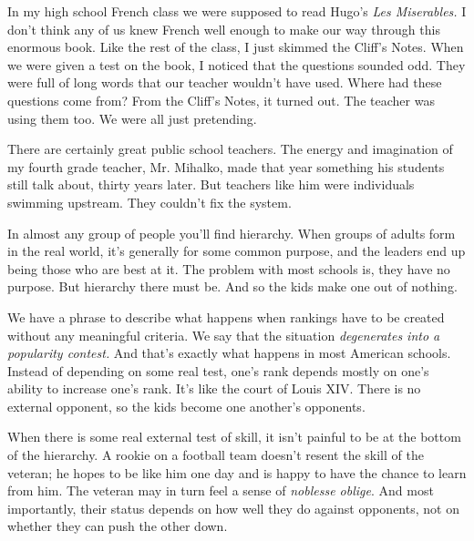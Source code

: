 In
                  my high school French class we were supposed to read Hugo's
                  \emph{Les Miserables.} I don't think any of us knew French
                  well enough to make our way through this enormous book. Like
                  the rest of the class, I just skimmed the Cliff's Notes. When
                  we were given a test on the book, I noticed that the questions
                  sounded odd. They were full of long words that our teacher
                  wouldn't have used. Where had these questions come from? From
                  the Cliff's Notes, it turned out. The teacher was using them
                  too. We were all just pretending.

There are
                  certainly great public school teachers. The energy and
                  imagination of my fourth grade teacher, Mr. Mihalko, made that
                  year something his students still talk about, thirty years
                  later. But teachers like him were individuals swimming
                  upstream. They couldn't fix the system.




                  In almost any group of people you'll find hierarchy. When
                  groups of adults form in the real world, it's generally for
                  some common purpose, and the leaders end up being those who
                  are best at it. The problem with most schools is, they have no
                  purpose. But hierarchy there must be. And so the kids make one
                  out of nothing.

We have a phrase to describe what
                  happens when rankings have to be created without any
                  meaningful criteria. We say that the situation
                  \emph{degenerates into a popularity contest.} And that's
                  exactly what happens in most American schools. Instead of
                  depending on some real test, one's rank depends mostly on
                  one's ability to increase one's rank. It's like the court of
                  Louis XIV. There is no external opponent, so the kids become
                  one another's opponents.

When there is some real
                  external test of skill, it isn't painful to be at the bottom
                  of the hierarchy. A rookie on a football team doesn't resent
                  the skill of the veteran; he hopes to be like him one day and
                  is happy to have the chance to learn from him. The veteran may
                  in turn feel a sense of \emph{noblesse oblige}. And most
                  importantly, their status depends on how well they do against
                  opponents, not on whether they can push the other down.

